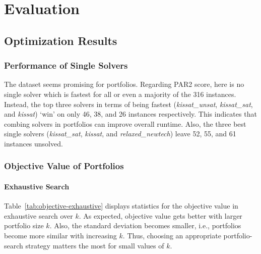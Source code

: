 \documentclass[conference]{IEEEtran}
\begin{document}
\section{Evaluation}
\label{sec:evaluation}

\subsection{Optimization Results}

\subsubsection{Performance of Single Solvers}

The dataset seems promising for portfolios.
Regarding PAR2 score, here is no single solver which is fastest for all or even a majority of the 316 instances.
Instead, the top three solvers in terms of being fastest (\emph{kissat\_unsat}, \emph{kissat\_sat}, and \emph{kissat}) `win' on only 46, 38, and 26 instances respectively.
This indicates that combing solvers in portfolios can improve overall runtime.
Also, the three best single solvers (\emph{kissat\_sat}, \emph{kissat}, and \emph{relaxed\_newtech}) leave 52, 55, and 61 instances unsolved.

\subsubsection{Objective Value of Portfolios}

\paragraph{Exhaustive Search}

Table~\ref{tab:objective-exhaustive} displays statistics for the objective value in exhaustive search over $k$.
As expected, objective value gets better with larger portfolio size $k$.
Also, the standard deviation becomes smaller, i.e., portfolios become more similar with increasing $k$.
Thus, choosing an appropriate portfolio-search strategy matters the most for small values of $k$.
\end{document}
